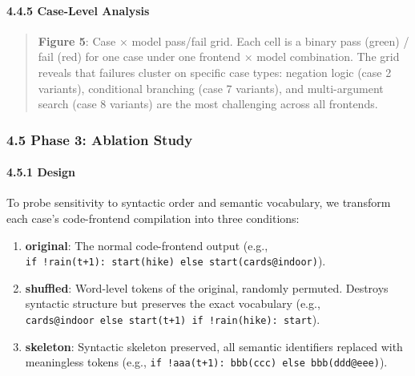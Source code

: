 \paragraph{4.4.5 Case-Level Analysis}\label{case-level-analysis}



\begin{quote}

\textbf{Figure 5}: Case × model pass/fail grid. Each cell is a binary pass (green) / fail (red) for one case under one frontend × model combination. The grid reveals that failures cluster on specific case types: negation logic (case 2 variants), conditional branching (case 7 variants), and multi-argument search (case 8 variants) are the most challenging across all frontends.

\end{quote}



\subsubsection{4.5 Phase 3: Ablation Study}\label{phase-3-ablation-study}



\paragraph{4.5.1 Design}\label{design}



To probe sensitivity to syntactic order and semantic vocabulary, we transform each case's code-frontend compilation into three conditions:



\begin{enumerate}

\def\labelenumi{\arabic{enumi}.}

\tightlist

\item

  \textbf{original}: The normal code-frontend output (e.g., \texttt{if\ !rain(t+1):\ start(hike)\ else\ start(cards@indoor)}).

\item

  \textbf{shuffled}: Word-level tokens of the original, randomly permuted. Destroys syntactic structure but preserves the exact vocabulary (e.g., \texttt{cards@indoor\ else\ start(t+1)\ if\ !rain(hike):\ start}).

\item

  \textbf{skeleton}: Syntactic skeleton preserved, all semantic identifiers replaced with meaningless tokens (e.g., \texttt{if\ !aaa(t+1):\ bbb(ccc)\ else\ bbb(ddd@eee)}).

\end{enumerate}



